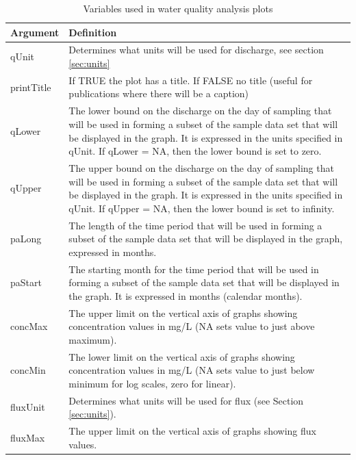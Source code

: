 \documentclass[a4paper,11pt]{article}\usepackage[]{graphicx}\usepackage[]{color}
\begin{document}
\begin{table}[ht]
\caption{Variables used in water quality analysis plots  \label{tab:wqVariables}}
\begin{tabularx}{\textwidth}{lX}
\hline
  \textbf{Argument} & \textbf{Definition} \\
\hline
qUnit & Determines what units will be used for discharge, see section \ref{sec:units}\\
printTitle & If TRUE the plot has a title.  If FALSE no title (useful for publications where there will be a caption)\\
qLower & The lower bound on the discharge on the day of sampling that will be used in forming a subset of the sample data set that will be displayed in the graph.  It is expressed in the units specified in qUnit.  If qLower = NA, then the lower bound is set to zero.\\
qUpper & The upper bound on the discharge on the day of sampling that will be used in forming a subset of the sample data set that will be displayed in the graph.  It is expressed in the units specified in qUnit.  If qUpper = NA, then the lower bound is set to infinity.\\
paLong & The length of the time period that will be used in forming a subset of the sample data set that will be displayed in the graph, expressed in months. \\ 
paStart & The starting month for the time period that will be used in forming a subset of the sample data set that will be displayed in the graph.  It is expressed in months (calendar months).\\
concMax & The upper limit on the vertical axis of graphs showing concentration values in mg/L (NA sets value to just above maximum).  \\
concMin & The lower limit on the vertical axis of graphs showing concentration values in mg/L (NA sets value to just below minimum for log scales, zero for linear).  \\
fluxUnit & Determines what units will be used for flux (see Section \ref{sec:units}).\\
fluxMax & The upper limit on the vertical axis of graphs showing flux values.  \\
\hline
\end{tabularx}

\end{table}

\FloatBarrier
\clearpage


\end{document}
